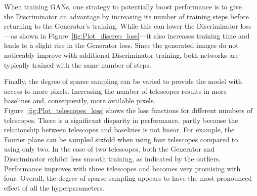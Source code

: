 When training GANs, one strategy to potentially boost performance is to give the Discriminator an advantage by increasing its number of training steps before returning to the Generator's training. While this can lower the Discriminator loss—as shown in Figure~\ref{fig:Plot_discrep_loss}—it also increases training time and leads to a slight rise in the Generator loss. Since the generated images do not noticeably improve with additional Discriminator training, both networks are typically trained with the same number of steps.

Finally, the degree of sparse sampling can be varied to provide the model with access to more pixels. Increasing the number of telescopes results in more baselines and, consequently, more available pixels. Figure~\ref{fig:Plot_telescopes_loss} shows the loss functions for different numbers of telescopes. There is a significant disparity in performance, partly because the relationship between telescopes and baselines is not linear. For example, the Fourier plane can be sampled sixfold when using four telescopes compared to using only two. In the case of two telescopes, both the Generator and Discriminator exhibit less smooth training, as indicated by the outliers. Performance improves with three telescopes and becomes very promising with four. Overall, the degree of sparse sampling appears to have the most pronounced effect of all the hyperparameters.
